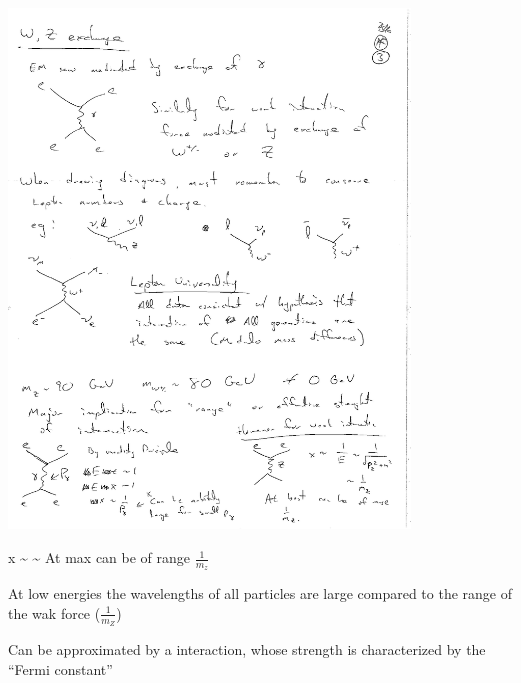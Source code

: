 {\begin{minipage}{0.4\textwidth}
\includegraphics[width=0.8\textwidth]{./eeZScattering.pdf}   
\end{minipage} %
\begin{minipage}{0.45\textwidth}
\bea
x \sim {} \sim {} 
\eea
At max can be of range $\frac{1}{m_z}$
\end{minipage} %

At low energies the wavelengths of all particles are large compared  to the range of the wak force ($\frac{1}{m_Z}$)

\clearpage

Can be approximated by a  interaction, whose strength is characterized by the ``Fermi constant'' 

}
